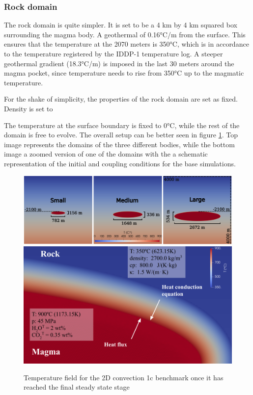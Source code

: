 \subsubsection{Rock domain}
The rock domain is quite simpler. It is set to be a 4 km by 4 km squared box surrounding the magma body. A geothermal of 0.16°C/m from the surface. This ensures that the temperature at the 2070 meters is 350°C, which is in accordance to the temperature registered by the IDDP-1 temperature log. A steeper geothermal gradient (18.3°C/m) is imposed in the last 30 meters around the magma pocket, since temperature needs to rise from 350°C up to the magmatic temperature.

For the shake of simplicity, the properties of the rock domain are set as fixed. Density is set to 

The temperature at the surface boundary is fixed to 0°C, while the rest of the domain is free to evolve.
The overall setup can be better seen in figure \ref{fig:ic_bc}. Top image represents the domains of the three different bodies, while the bottom image a zoomed version of one of the domains with the a schematic representation of the initial and coupling conditions for the base simulations. 

\begin{figure}
	\centering
	\includegraphics[width=1\linewidth]{img/chapter2/sim_setup/ic_cut.png}
	\includegraphics[width=1\linewidth]{img/chapter2/sim_setup/setup.png}
	\caption{Temperature field for the 2D convection 1c benchmark once it has reached the final steady state stage}
	\label{fig:ic_bc}
\end{figure}

